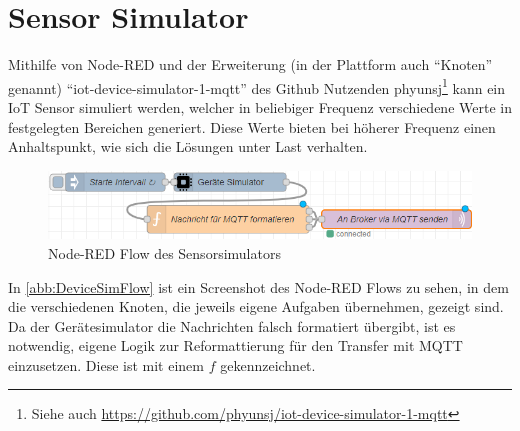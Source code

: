 \section{Sensor Simulator}\label{chap:iotdevicesim}
Mithilfe von Node-RED und der Erweiterung (in der Plattform auch \enquote{Knoten} genannt) \enquote{iot-device-simulator-1-mqtt} des Github Nutzenden phyunsj\footnote{Siehe auch \url{https://github.com/phyunsj/iot-device-simulator-1-mqtt}} kann ein \ac{IoT} Sensor simuliert werden, welcher in beliebiger Frequenz verschiedene Werte in festgelegten Bereichen generiert. Diese Werte bieten bei höherer Frequenz einen Anhaltspunkt, wie sich die Lösungen unter Last verhalten.
\begin{figure}[H]
\centering
\includegraphics[width=\textwidth]{graphics/Device-Simulator-Flow.png}
\caption{Node-RED Flow des Sensorsimulators}
\label{abb:DeviceSimFlow}
\end{figure}

In \autoref{abb:DeviceSimFlow} ist ein Screenshot des Node-RED Flows zu sehen, in dem die verschiedenen Knoten, die jeweils eigene Aufgaben übernehmen, gezeigt sind. Da der Gerätesimulator die Nachrichten falsch formatiert übergibt, ist es notwendig, eigene Logik zur Reformattierung für den Transfer mit \ac{MQTT} einzusetzen. Diese ist mit einem $f$ gekennzeichnet.



